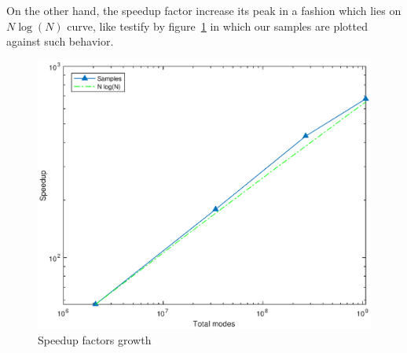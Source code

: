 On the other hand, the speedup factor increase its peak in a fashion which lies on $N\log(N)$ curve, like testify by figure~\ref{speedup:trend} in which our samples are plotted against such behavior. \\
\begin{figure}[h]
\begin{center}
\includegraphics[scale=0.55]{grafici/speedup_trend}
\caption{Speedup factors growth}
\label{speedup:trend}
\end{center}
\end{figure}
\par

